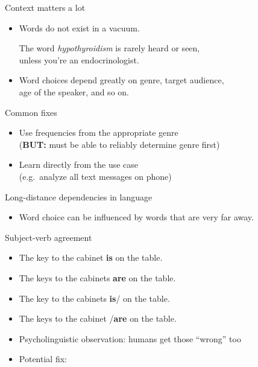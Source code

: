 \documentclass[professionalfonts, xcolor={usenames,svgnames,x11names,table}]{beamer}
\begin{document}
\begin{frame}{Context matters a lot}
    \begin{itemize}
        \item Words do not exist in a vacuum.

        \begin{example}
            The word \emph{hypothyroidism} is rarely heard or seen,\\
            unless you're an endocrinologist.
        \end{example}

        \item Word choices depend greatly on genre, target audience,\\
              age of the speaker, and so on.
    \end{itemize}

    \begin{block}{Common fixes}
        \begin{itemize}
            \item Use frequencies from the appropriate genre\\
                  (\textbf{BUT:} must be able to reliably determine genre first)
            \item Learn directly from the use case\\
                  (e.g.~analyze all text messages on phone)
        \end{itemize}
    \end{block}
\end{frame}

\begin{frame}{Long-distance dependencies in language}
    \begin{itemize}
        \item Word choice can be influenced by words that are very far away.
    \end{itemize}

    \begin{exampleblock}{Subject-verb agreement}
        \begin{itemize}
            \item The key to the cabinet \textbf{is} on the table.
            \item The keys to the cabinets \textbf{are} on the table.
            \item The key to the cabinets \textbf{is}\slash{} on the table.
            \item The keys to the cabinet \slash\textbf{are} on the table.
        \end{itemize}
    \end{exampleblock}

    \begin{itemize}
        \item Psycholinguistic observation: humans get those ``wrong'' too
        \item Potential fix: 
    \end{itemize}
\end{frame}
\end{document}
